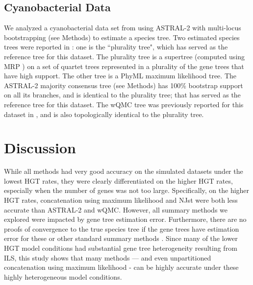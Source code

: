 \subsection{Cyanobacterial Data}

We analyzed a cyanobacterial data set from \cite{Cyanobacteria} using ASTRAL-2 with multi-locus bootstrapping (see Methods) to 
estimate a species tree.   
Two estimated species trees were
reported in \cite{Cyanobacteria}: one is the
``plurality tree", which has served
as the reference tree for this dataset.
The plurality tree is a supertree (computed using
MRP \cite{baum_mrp_2004}) on a set of
quartet trees represented in a plurality of 
the gene trees that have high support. 
The other tree is a PhyML \cite{PhyML} maximum likelihood
tree. 
The ASTRAL-2 majority consensus tree (see Methods) 
has 100\% bootstrap support on all its branches, and is 
identical to the plurality tree; 
that has served as the reference tree for this dataset.
The wQMC tree was previously reported for this dataset in \cite{wQMC}, and is
also topologically  identical to the plurality tree. 



\section{Discussion}  
While all methods  had very good accuracy on
the simulated datasets under the 
lowest HGT rates, they were clearly differentiated on the higher HGT rates,
especially when the number of genes was not too large. 
Specifically, on the higher HGT rates, concatenation using 
maximum likelihood and NJst were both less
accurate than ASTRAL-2 and wQMC. 
However, all summary methods we explored were impacted
by gene tree estimation error. Furthermore,   there are no proofs
of convergence to the true species tree if the gene
trees have estimation error for these or other
standard summary methods \cite{RochWarnow,WarnowCurrents2015}.
Since many of the lower HGT model conditions
had substantial gene tree heterogeneity resulting from ILS,
this study shows that many methods — and even unpartitioned concatenation  using
maximum likelihood - can be highly accurate under these highly heterogeneous 
model conditions. 

